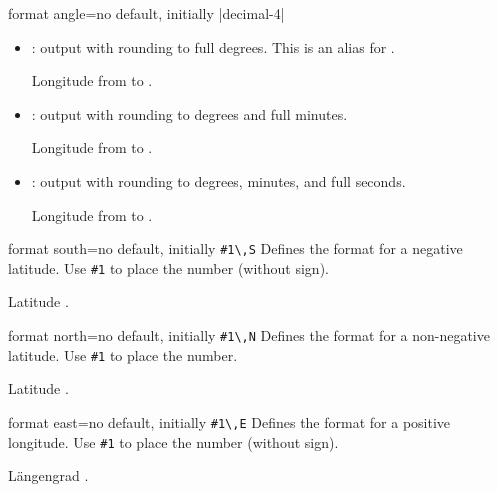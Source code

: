\begin{docMrcKey}{format angle}{=}{no default, initially |decimal-4|}
\begin{itemize}
  \item{}: output with rounding to full degrees.
      This is an alias for .
    \begin{dispExample}
      Longitude from  to .
    \end{dispExample}
  \item{}: output with rounding to degrees and full minutes.
    \begin{dispExample}
      Longitude from  to .
    \end{dispExample}
  \item{}: output with rounding to degrees, minutes, and full seconds.
    \begin{dispExample}
      Longitude from  to .
    \end{dispExample}
  \end{itemize}
\end{docMrcKey}


\begin{docMrcKey}{format south}{=}{no default, initially \texttt{\#1\textbackslash,S}}
  Defines the format  for a negative latitude.
  Use \texttt{\#1} to place the number (without sign).
  \begin{dispExample}
    Latitude .
  \end{dispExample}
\end{docMrcKey}

\begin{docMrcKey}{format north}{=}{no default, initially \texttt{\#1\textbackslash,N}}
  Defines the format  for a non-negative latitude.
  Use \texttt{\#1} to place the number.
  \begin{dispExample}
    Latitude .
  \end{dispExample}
\end{docMrcKey}

\pagebreak
\begin{docMrcKey}{format east}{=}{no default, initially \texttt{\#1\textbackslash,E}}
  Defines the format  for a positive longitude.
  Use \texttt{\#1} to place the number (without sign).
  \begin{dispExample}
    L\"angengrad .
  \end{dispExample}
\end{docMrcKey}

